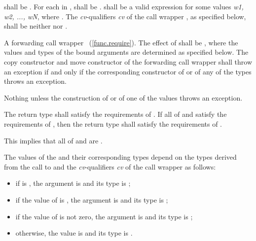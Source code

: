\begin{itemdescr}
\pnum
\requires
{} shall be . For each 
in ,  shall be .
 shall be  a valid
expression for some
values \textit{w1, w2, ..., wN}, where
.
The \textit{cv}-qualifiers \textit{cv} of the call wrapper ,
as specified below, shall be neither  nor .

\pnum
\returns
A forwarding call wrapper ~(\ref{func.require}).
The effect of
 shall be , where the values and types of the bound
arguments  are determined as specified below.
The copy constructor and move constructor of the forwarding call wrapper shall throw an
exception if and only if the corresponding constructor of  or of any of the types
 throws an exception.

\pnum
\throws Nothing unless the construction of
 or of one of the values  throws an exception.

\pnum
\remarks The return type shall satisfy the requirements of . If all
of  and  satisfy the requirements of , then the
return type shall satisfy the requirements of . \begin{note} This implies
that all of  and  are . \end{note}
\end{itemdescr}

\pnum
{}%
The values of the   and their
corresponding types  depend on the
types  derived from
the call to  and the
\textit{cv}-qualifiers \textit{cv} of the call wrapper  as follows:

\begin{itemize}
\item if  is , the
argument is  and its type  is ;

\item if the value of 
is , the argument is   and its
type  is
;

\item if the value  of 
is not zero, the  argument is 
and its type 
is ;

\item otherwise, the value is  and its type 
is .
\end{itemize}

